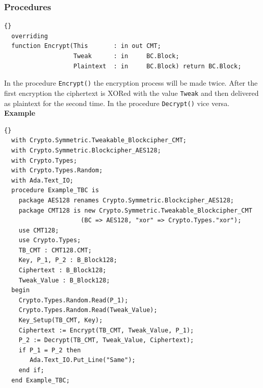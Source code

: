 \subsubsection*{Procedures}
\begin{lstlisting}{}
  overriding
  function Encrypt(This       : in out CMT;
                   Tweak      : in     BC.Block;
                   Plaintext  : in     BC.Block) return BC.Block;
\end{lstlisting}
In the procedure \texttt{Encrypt()} the encryption process will be
made twice. After the first encryption the ciphertext is XORed with
the value \texttt{Tweak} and then delivered as plaintext for the
second time. In the procedure \texttt{Decrypt()} vice versa.\\


\noindent\textbf{Example}
\begin{lstlisting}{}
  with Crypto.Symmetric.Tweakable_Blockcipher_CMT;
  with Crypto.Symmetric.Blockcipher_AES128;
  with Crypto.Types;
  with Crypto.Types.Random;
  with Ada.Text_IO;
  procedure Example_TBC is
    package AES128 renames Crypto.Symmetric.Blockcipher_AES128;
    package CMT128 is new Crypto.Symmetric.Tweakable_Blockcipher_CMT
   					 (BC => AES128, "xor" => Crypto.Types."xor");
    use CMT128;
    use Crypto.Types;
    TB_CMT : CMT128.CMT;
    Key, P_1, P_2 : B_Block128;
    Ciphertext : B_Block128;
    Tweak_Value : B_Block128;
  begin
    Crypto.Types.Random.Read(P_1);
    Crypto.Types.Random.Read(Tweak_Value);
    Key_Setup(TB_CMT, Key);
    Ciphertext := Encrypt(TB_CMT, Tweak_Value, P_1);
    P_2 := Decrypt(TB_CMT, Tweak_Value, Ciphertext);
    if P_1 = P_2 then
       Ada.Text_IO.Put_Line("Same");
    end if;
  end Example_TBC;
\end{lstlisting}
